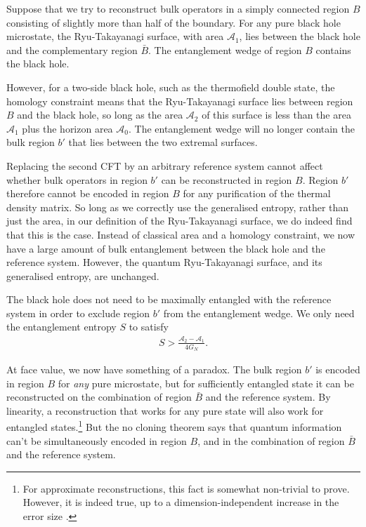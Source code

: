 \documentclass[12pt]{article}
\begin{document}
\begin{figure}[t]
\label{fig:bhentwedge}

\end{figure}

Suppose that we try to reconstruct bulk operators in a simply connected region $B$ consisting of slightly more than half of the boundary. For any pure black hole microstate, the Ryu-Takayanagi surface, with area $\mathcal{A}_1$, lies between the black hole and the complementary region $\bar{B}$. The entanglement wedge of region $B$ contains the black hole.

However, for a two-side black hole, such as the thermofield double state, the homology constraint means that the Ryu-Takayanagi surface lies between region $B$ and the black hole, so long as the area $\mathcal{A}_2$ of this surface is less than the area $\mathcal{A}_1$ plus the horizon area $\mathcal{A}_0$. The entanglement wedge will no longer contain the bulk region $b'$ that lies between the two extremal surfaces.

Replacing the second CFT by an arbitrary reference system cannot affect whether bulk operators in region $b'$ can be reconstructed in region $B$. Region $b'$ therefore cannot be encoded in region $B$ for any purification of the thermal density matrix. So long as we correctly use the generalised entropy, rather than just the area, in our definition of the Ryu-Takayanagi surface, we do indeed find that this is the case. Instead of classical area and a homology constraint, we now have a large amount of bulk entanglement between the black hole and the reference system. However, the quantum Ryu-Takayanagi surface, and its generalised entropy, are unchanged.

The black hole does not need to be maximally entangled with the reference system in order to exclude region $b'$ from the entanglement wedge. We only need the entanglement entropy $S$ to satisfy
\begin{align}\label{eq:diff7}
S > \frac{\mathcal{A}_2 - \mathcal{A}_1}{4G_N}.
\end{align}

At face value, we now have something of a paradox. The bulk region $b'$ is encoded in region $B$ for \emph{any} pure microstate, but for sufficiently entangled state it can be reconstructed on the combination of region $\bar B$ and the reference system. By linearity, a reconstruction that works for any pure state will also work for entangled states.\footnote{For approximate reconstructions, this fact is somewhat non-trivial to prove. However, it is indeed true, up to a dimension-independent increase in the error size \cite{kretschmann2004tema}.} But the no cloning theorem says that quantum information can't be simultaneously encoded in region $B$, and in the combination of region $\bar B$ and the reference system.
\end{document}
